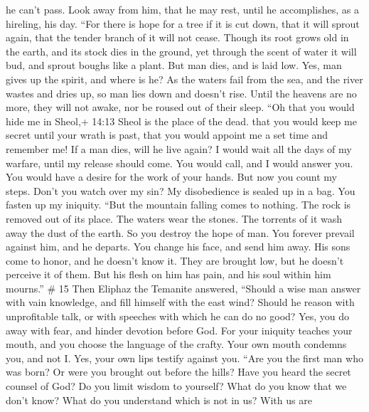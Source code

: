 he can't pass.  Look away from him, that he may rest, until
he accomplishes, as a hireling, his day.  ``For there is
hope for a tree if it is cut down, that it will sprout again, that the
tender branch of it will not cease.  Though its root grows
old in the earth, and its stock dies in the ground,  yet
through the scent of water it will bud, and sprout boughs like a plant.
 But man dies, and is laid low. Yes, man gives up the
spirit, and where is he?  As the waters fail from the sea,
and the river wastes and dries up,  so man lies down and
doesn't rise. Until the heavens are no more, they will not awake, nor be
roused out of their sleep.  ``Oh that you would hide me in
Sheol,+ 14:13 Sheol is the place of the dead. that you would keep me
secret until your wrath is past, that you would appoint me a set time
and remember me!  If a man dies, will he live again? I
would wait all the days of my warfare, until my release should come.
 You would call, and I would answer you. You would have a
desire for the work of your hands.  But now you count my
steps. Don't you watch over my sin?  My disobedience is
sealed up in a bag. You fasten up my iniquity.  ``But the
mountain falling comes to nothing. The rock is removed out of its place.
 The waters wear the stones. The torrents of it wash away
the dust of the earth. So you destroy the hope of man.  You
forever prevail against him, and he departs. You change his face, and
send him away.  His sons come to honor, and he doesn't know
it. They are brought low, but he doesn't perceive it of them.
 But his flesh on him has pain, and his soul within him
mourns.'' \# 15  Then Eliphaz the Temanite answered,
 ``Should a wise man answer with vain knowledge, and fill
himself with the east wind?  Should he reason with
unprofitable talk, or with speeches with which he can do no good?
 Yes, you do away with fear, and hinder devotion before God.
 For your iniquity teaches your mouth, and you choose the
language of the crafty.  Your own mouth condemns you, and
not I. Yes, your own lips testify against you.  ``Are you
the first man who was born? Or were you brought out before the hills?
 Have you heard the secret counsel of God? Do you limit
wisdom to yourself?  What do you know that we don't know?
What do you understand which is not in us?  With us are
